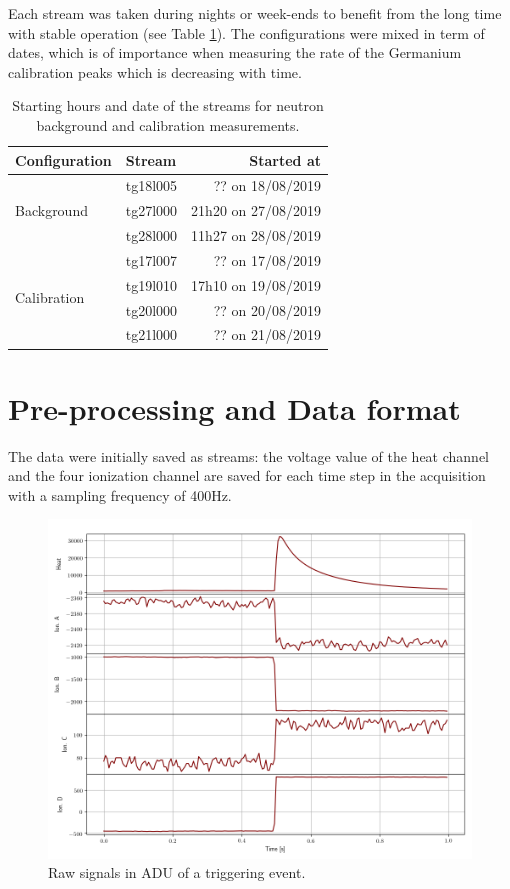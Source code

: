 Each stream was taken during nights or week-ends to benefit from the long time with stable operation (see Table \ref{tab:neutron-streams}). The configurations were mixed in term of dates, which is of importance when measuring the rate of the Germanium calibration peaks which is decreasing with time.

\begin{table}[]
\centering
\begin{tabular}{l|l|r}
Configuration                & Stream   & Started at          \\ \hline
\multirow{3}{*}{Background}  & tg18l005 & ?? on 18/08/2019    \\
                             & tg27l000 & 21h20 on 27/08/2019 \\
                             & tg28l000 & 11h27 on 28/08/2019 \\ \hline
\multirow{4}{*}{Calibration} & tg17l007 & ?? on 17/08/2019    \\
                             & tg19l010 & 17h10 on 19/08/2019 \\
                             & tg20l000 & ?? on 20/08/2019    \\
                             & tg21l000 & ?? on 21/08/2019   
\end{tabular}
\caption{Starting hours and date of the streams for neutron background and calibration measurements.}
\label{tab:neutron-streams}
\end{table}


\section{Pre-processing and Data format}
\label{par:data-format}
\label{par:of-processing}

The data were initially saved as streams: the voltage value of the heat channel and the four ionization channel are saved for each time step in the acquisition with a sampling frequency of 400Hz. 

\begin{figure}
\centering
\includegraphics[width=\linewidth,]{Figures/Neutron/event_example.png}
\caption{Raw signals in ADU of a triggering event.}
\label{fig:event-example}
\end{figure}

